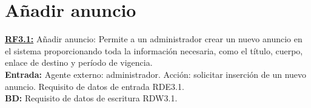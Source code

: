 



\section{Añadir anuncio}
\textbf{\textcolor{rojo}{\underline{RF3.1:}}} Añadir anuncio: Permite a un administrador crear un nuevo anuncio en el sistema proporcionando toda la información necesaria, como el título, cuerpo, enlace de destino y período de vigencia. \\[6pt]

\textbf{\textcolor{rojo}{Entrada:}} Agente externo: administrador. Acción: solicitar inserción de un nuevo anuncio. 
Requisito de datos de entrada \textcolor{azul}{RDE3.1}. \\[6pt]

\textbf{\textcolor{rojo}{BD:}} Requisito de datos de escritura \textcolor{azul}{RDW3.1}. \\[6pt]

